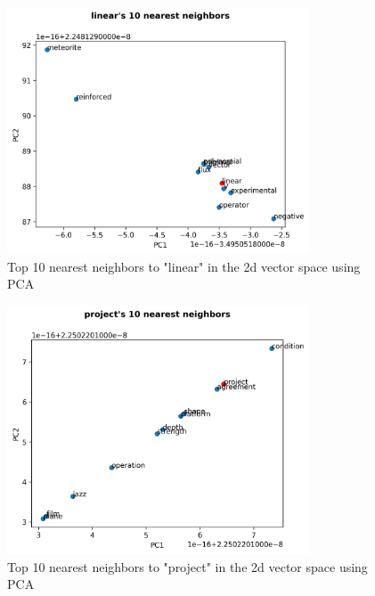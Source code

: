 \documentclass[12pt,letterpaper]{article}
\begin{document}
\begin{figure}[H]
\begin{center}
  \includegraphics[width=0.8\textwidth]{../graphs/linear_neighbors.png}
\end{center}
\caption{Top 10 nearest neighbors to "linear" in the 2d vector space using PCA}
\end{figure}

\begin{figure}[H]
\begin{center}
  \includegraphics[width=0.8\textwidth]{../graphs/project_neighbors.png}
\end{center}
\caption{Top 10 nearest neighbors to "project" in the 2d vector space using PCA}
\end{figure}
\end{document}
